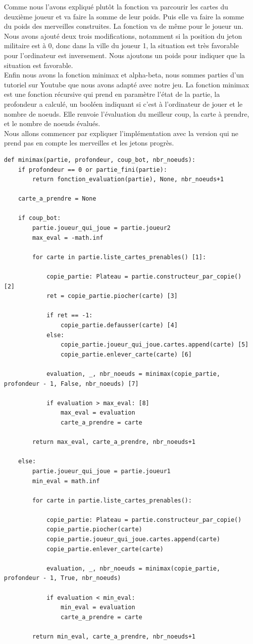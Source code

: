 \documentclass[12pt]{article}
\begin{document}
		Comme nous l'avons expliqué plutôt la fonction va parcourir les cartes du deuxième joueur et va faire la somme de leur poids. Puis elle va faire la somme du poids des merveilles construites. La fonction va de même pour le joueur un. Nous avons ajouté deux trois modifications, notamment si la position du jeton militaire est à 0, donc dans la ville du joueur 1, la situation est très favorable pour l'ordinateur
		est inversement. Nous ajoutons un poids pour indiquer que la situation est favorable. \\
		Enfin nous avons la fonction minimax et alpha-beta, nous sommes parties d'un tutoriel sur Youtube \cite{implementation_minimax_alpha_beta} que nous avons adapté avec notre jeu. La fonction minimax est une fonction récursive qui prend en paramètre l'état de la partie, la profondeur a calculé, un booléen indiquant si c'est à l'ordinateur de jouer et le nombre de noeuds. Elle renvoie l'évaluation du meilleur coup, la carte à prendre, et le nombre de noeuds évalués. \\
		Nous allons commencer par expliquer l'implémentation avec la version qui ne prend pas en compte les merveilles et les jetons progrès.
		\begin{lstlisting}
def minimax(partie, profondeur, coup_bot, nbr_noeuds):
	if profondeur == 0 or partie_fini(partie):
		return fonction_evaluation(partie), None, nbr_noeuds+1
	
	carte_a_prendre = None
	
	if coup_bot:
		partie.joueur_qui_joue = partie.joueur2
		max_eval = -math.inf
		
		for carte in partie.liste_cartes_prenables() [1]:
			
			copie_partie: Plateau = partie.constructeur_par_copie() [2]
			ret = copie_partie.piocher(carte) [3]
			
			if ret == -1:
				copie_partie.defausser(carte) [4]
			else:
				copie_partie.joueur_qui_joue.cartes.append(carte) [5]
				copie_partie.enlever_carte(carte) [6]
			
			evaluation, _, nbr_noeuds = minimax(copie_partie, profondeur - 1, False, nbr_noeuds) [7]
			
			if evaluation > max_eval: [8]
				max_eval = evaluation
				carte_a_prendre = carte
				
		return max_eval, carte_a_prendre, nbr_noeuds+1
	
	else:
		partie.joueur_qui_joue = partie.joueur1
		min_eval = math.inf
		
		for carte in partie.liste_cartes_prenables():
			
			copie_partie: Plateau = partie.constructeur_par_copie()
			copie_partie.piocher(carte)
			copie_partie.joueur_qui_joue.cartes.append(carte)
			copie_partie.enlever_carte(carte)
		
			evaluation, _, nbr_noeuds = minimax(copie_partie, profondeur - 1, True, nbr_noeuds)
			
			if evaluation < min_eval:
				min_eval = evaluation
				carte_a_prendre = carte
		
		return min_eval, carte_a_prendre, nbr_noeuds+1
		\end{lstlisting}
\end{document}

